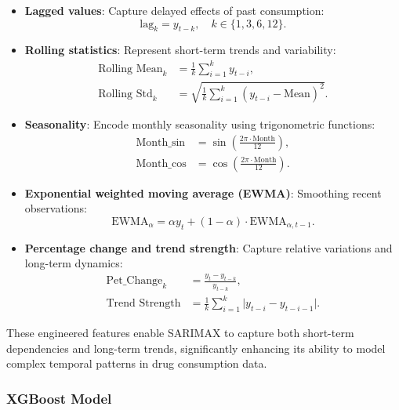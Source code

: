 \documentclass[journal]{IEEEtran}
\begin{document}
\begin{itemize}
    \item \textbf{Lagged values}: Capture delayed effects of past consumption:
    \begin{equation}
    \text{lag}_{k} = y_{t-k}, \quad k \in \{1, 3, 6, 12\}.
    \end{equation}
    
    \item \textbf{Rolling statistics}: Represent short-term trends and variability:
    \begin{align}
    \text{Rolling Mean}_{k} &= \frac{1}{k} \sum_{i=1}^{k} y_{t-i}, \\
    \text{Rolling Std}_{k} &= \sqrt{\frac{1}{k} \sum_{i=1}^{k} (y_{t-i} - \text{Mean})^2}.
    \end{align}
    
    \item \textbf{Seasonality}: Encode monthly seasonality using trigonometric functions:
    \begin{align}
    \text{Month\_sin} &= \sin\left(\frac{2\pi \cdot \text{Month}}{12}\right), \\
    \text{Month\_cos} &= \cos\left(\frac{2\pi \cdot \text{Month}}{12}\right).
    \end{align}
    
    \item \textbf{Exponential weighted moving average (EWMA)}: Smoothing recent observations:
    \begin{equation}
    \text{EWMA}_{\alpha} = \alpha y_{t} + (1-\alpha) \cdot \text{EWMA}_{\alpha,t-1}.
    \end{equation}
    
    \item \textbf{Percentage change and trend strength}: Capture relative variations and long-term dynamics:
    \begin{align}
    \text{Pet\_Change}_{k} &= \frac{y_{t} - y_{t-k}}{y_{t-k}}, \\
    \text{Trend Strength} &= \frac{1}{k} \sum_{i=1}^{k} \lvert y_{t-i} - y_{t-i-1} \rvert.
    \end{align}
\end{itemize}

These engineered features enable SARIMAX to capture both short-term dependencies and long-term trends, significantly enhancing its ability to model complex temporal patterns in drug consumption data.

\subsubsection{XGBoost Model}
\end{document}
